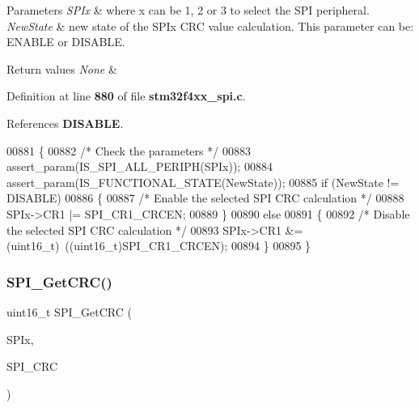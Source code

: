 \begin{DoxyParams}{Parameters}
{\em S\+P\+Ix} & where x can be 1, 2 or 3 to select the S\+PI peripheral. \\
\hline
{\em New\+State} & new state of the S\+P\+Ix C\+RC value calculation. This parameter can be\+: E\+N\+A\+B\+LE or D\+I\+S\+A\+B\+LE. \\
\hline
\end{DoxyParams}

\begin{DoxyRetVals}{Return values}
{\em None} & \\
\hline
\end{DoxyRetVals}


Definition at line \textbf{ 880} of file \textbf{ stm32f4xx\+\_\+spi.\+c}.



References \textbf{ D\+I\+S\+A\+B\+LE}.


\begin{DoxyCode}
00881 \{
00882   \textcolor{comment}{/* Check the parameters */}
00883   assert_param(IS_SPI_ALL_PERIPH(SPIx));
00884   assert_param(IS_FUNCTIONAL_STATE(NewState));
00885   \textcolor{keywordflow}{if} (NewState != DISABLE)
00886   \{
00887     \textcolor{comment}{/* Enable the selected SPI CRC calculation */}
00888     SPIx->CR1 |= SPI_CR1_CRCEN;
00889   \}
00890   \textcolor{keywordflow}{else}
00891   \{
00892     \textcolor{comment}{/* Disable the selected SPI CRC calculation */}
00893     SPIx->CR1 &= (uint16\_t)~((uint16\_t)SPI_CR1_CRCEN);
00894   \}
00895 \}
\end{DoxyCode}
\mbox{\label{group__SPI__Group3_ga4c81c193516e82cf0a2fdc149ef20cc6}} 
\subsubsection{S\+P\+I\+\_\+\+Get\+C\+R\+C()}
{\footnotesize\ttfamily uint16\+\_\+t S\+P\+I\+\_\+\+Get\+C\+RC (\begin{DoxyParamCaption}\item[{\textbf{ S\+P\+I\+\_\+\+Type\+Def} $\ast$}]{S\+P\+Ix,  }\item[{uint8\+\_\+t}]{S\+P\+I\+\_\+\+C\+RC }\end{DoxyParamCaption})}



